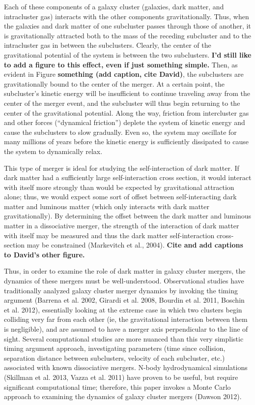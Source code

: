 \message{ !name(THESIS_LATEX_WHAT_THE_HECK.tex)}\documentclass[12 pt]{article}
\begin{document}
Each of these components of a galaxy cluster (galaxies, dark matter, and intracluster gas) interacts with the other components gravitationally. Thus, when the galaxies and dark matter of one subcluster passes through those of another, it is gravitationally attracted both to the mass of the receding subcluster and to the intracluster gas in between the subclusters. Clearly, the center of the gravitational potential of the system is between the two subclusters. \textbf{I'd still like to add a figure to this effect, even if just something simple.} Then, as evident in Figure \textbf{something (add caption, cite David)}, the subclusters are gravitationally bound to the center of the merger. At a certain point, the subcluster's kinetic energy will be insufficient to continue traveling away from the center of the merger event, and the subcluster will thus begin returning to the center of the gravitational potential. Along the way, friction from intercluster gas and other forces (“dynamical friction”) deplete the system of kinetic energy and cause the subclusters to slow gradually. Even so, the system may oscillate for many millions of years before the kinetic energy is sufficiently dissipated to cause the system to dynamically relax.

This type of merger is ideal for studying the self-interaction of dark matter. If dark matter had a sufficiently large self-interaction cross section, it would interact with itself more strongly than would be expected by gravitational attraction alone; thus, we would expect some sort of offset between self-interacting dark matter and luminous matter (which only interacts with dark matter gravitationally). By determining the offset between the dark matter and luminous matter in a dissociative merger, the strength of the interaction of dark matter with itself may be measured and thus the dark matter self-interaction cross-section may be constrained (Markevitch et al., 2004). \textbf{Cite and add captions to David's other figure.}

Thus, in order to examine the role of dark matter in galaxy cluster mergers, the dynamics of these mergers must be well-understood. Observational studies have traditionally analyzed galaxy cluster merger dynamics by invoking the timing argument (Barrena et al. 2002, Girardi et al. 2008, Bourdin et al. 2011, Boschin et al. 2012), essentially looking at the extreme case in which two clusters begin colliding very far from each other (ie, the gravitational interaction between them is negligible), and are assumed to have a merger axis perpendicular to the line of sight. Several computational studies are more nuanced than this very simplistic timing argument approach, investigating parameters (time since collision, separation distance between subclusters, velocity of each subcluster, etc.) associated with known dissociative mergers. N-body hydrodynamical simulations (Skillman et al. 2013, Vazza et al. 2011) have proven to be useful, but require significant computational time; therefore, this paper invokes a Monte Carlo approach to examining the dynamics of galaxy cluster mergers (Dawson 2012).
\end{document}
